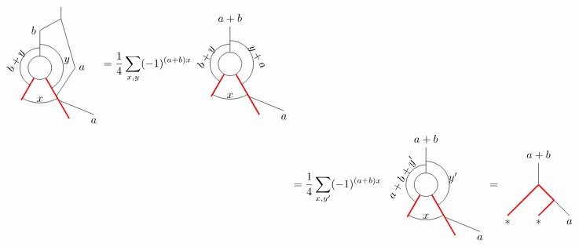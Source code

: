 \begin{align}
\begin{tikzpicture}[scale=.75,baseline=(current bounding box.center)]
		\draw (0,0) circle (0.5cm);
		\draw[red,line width=0.4mm]
		\foreach \a in {-60, -120} {
			(\a:0.5) -- (\a:1.6)
		};
		\draw[] (90:0.5) -- (90:1.6);
		\draw ([shift=(-60:1cm)]0,0) arc (-60:90:1cm);
		\draw ([shift=(-120:1.5cm)]0,0) arc (-120:-60:1.5cm);
		\draw ([shift=(240:0.85cm)]0,0) arc (240:90:0.85cm);
		\draw[] (0,1.6) -- (0.9,2.1) node[pos=0,left] {$b$};
		\draw[] (0.9,2.1) -- (0.9,2.6);
		\draw (-60:1.6) -- (2.3,-2) node[pos=1,below] {$a$};
		\draw (-60:1.4) --(1.5,0) node[right]{$a$} -- (0.9,2.1);
		\node[rotate=60] at (-1,0.3) {$b+y$};
		\node at (1.15,0.3) {$y$};
		\node at (0,-1.35) {$x$};
		\draw[red,line width=0.4mm] (-60:1.6)--(-60:2.5);
		\end{tikzpicture}
		=\frac{1}{4}\sum_{x,y}(-1)^{(a+b)x}
		\begin{tikzpicture}[scale=.75,baseline=(current bounding box.center)]
		\draw (0,0) circle (0.5cm);
		\draw[red,line width=0.4mm]
		\foreach \a in {-60, -120} {
			(\a:0.5) -- (\a:1.6)
		};
		\draw[] (90:0.5) -- (90:1.6) node[pos=1,above]{$a+b$};
		\draw ([shift=(-60:1cm)]0,0) arc (-60:90:1cm);
		\draw ([shift=(-120:1.5cm)]0,0) arc (-120:-60:1.5cm);
		\draw ([shift=(240:0.85cm)]0,0) arc (240:90:0.85cm);
		\draw (-60:1.6) -- (2.3,-2) node[pos=1,below] {$a$};
		\node[rotate=60] at (-1,0.3) {$b+y$};
		\node[rotate=-60] at (1.15,0.3) {$y+a$};
		\node at (0,-1.35) {$x$};
		\draw[red,line width=0.4mm] (-60:1.6)--(-60:2.5);
		\end{tikzpicture}\\
		&=\frac{1}{4}\sum_{x,y^\prime}(-1)^{(a+b)x}
		\begin{tikzpicture}[scale=.75,baseline=(current bounding box.center)]
		\draw (0,0) circle (0.5cm);
		\draw[red,line width=0.4mm]
		\foreach \a in {-60, -120} {
			(\a:0.5) -- (\a:1.6)
		};
		\draw[] (90:0.5) -- (90:1.6) node[pos=1,above]{$a+b$};
		\draw ([shift=(-60:1cm)]0,0) arc (-60:90:1cm);
		\draw ([shift=(-120:1.5cm)]0,0) arc (-120:-60:1.5cm);
		\draw ([shift=(240:0.85cm)]0,0) arc (240:90:0.85cm);
		\draw (-60:1.6) -- (2.3,-2) node[pos=1,below] {$a$};
		\node[rotate=60] at (-1,0.3) {$a+b+y^\prime$};
		\node at (1.15,0.3) {$y^\prime$};
		\node at (0,-1.35) {$x$};
		\draw[red,line width=0.4mm] (-60:1.6)--(-60:2.5);
		\end{tikzpicture}
		=\begin{tikzpicture}[xscale=-1,scale=0.7,baseline=(current bounding box.center)]
		\draw[] (0,0) -- (0,1) node[pos=1,above]{$a+b$};
		\draw[red,line width=0.4mm] (0,0) -- (-0.707107,-0.707107);
		\draw[] (-0.707107,-0.707107) -- (-1.41421,-1.41421);
		\draw[red,line width=0.4mm] (-0.707107,-0.707107) -- (0,-1.41421);
		\draw[red,line width=0.4mm] (0,0) -- (0.707107,-0.707107);
		\draw[red,line width=0.4mm] (0.707107,-0.707107) -- (1.41421,-1.41421);
		\node at (-1.41421,-1.7) {$a$};
		\node at (0,-1.7) {$*$};
		\node at (1.41421,-1.7) {$*$};
		\end{tikzpicture}
	\end{align}
